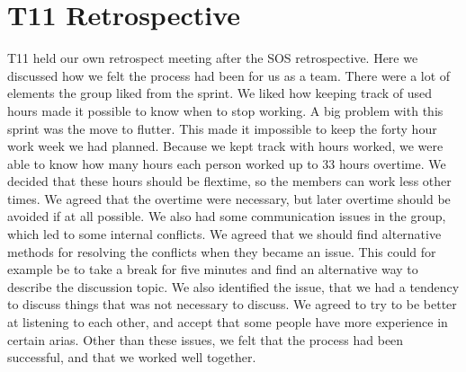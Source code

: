 \section{T11 Retrospective}
\gls{T11} held our own retrospect meeting after the SOS retrospective. Here we discussed how we felt the process had been for us as a team. There were a lot of elements the group liked from the sprint. We liked how keeping track of used hours made it possible to know when to stop working. A big problem with this sprint was the move to flutter. This made it impossible to keep the forty hour work week we had planned. Because we kept track with hours worked, we were able to know how many hours each person worked up to 33 hours overtime. We decided that these hours should be flextime, so the members can work less other times. We agreed that the overtime were necessary, but later overtime should be avoided if at all possible. We also had some communication issues in the group, which led to some internal conflicts. We agreed that we should find alternative methods for resolving the conflicts when they became an issue. This could for example be to take a break for five minutes and find an alternative way to describe the discussion topic. We also identified the issue, that we had a tendency to discuss things that was not necessary to discuss. We agreed to try to be better at listening to each other, and accept that some people have more experience in certain arias. Other than these issues, we felt that the process had been successful, and that we worked well together.

